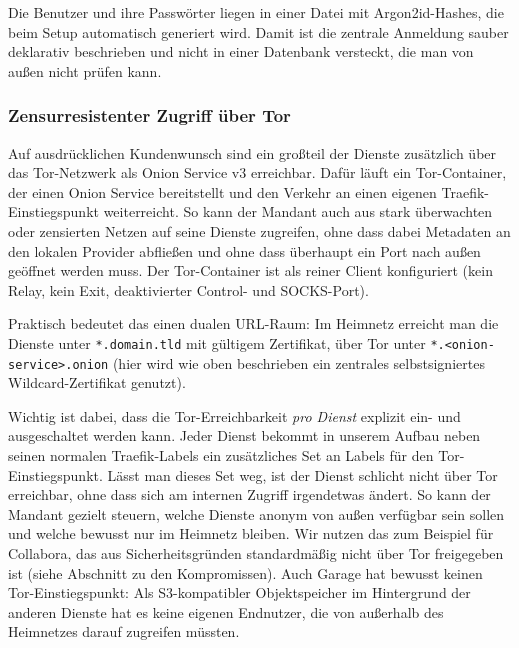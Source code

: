 Die Benutzer und ihre Passwörter liegen in einer Datei mit Argon2id-Hashes, die
beim Setup automatisch generiert wird. Damit ist die zentrale Anmeldung sauber
deklarativ beschrieben und nicht in einer Datenbank versteckt, die man von außen
nicht prüfen kann.

\subsubsection{Zensurresistenter Zugriff über Tor}

Auf ausdrücklichen Kundenwunsch sind ein großteil der Dienste zusätzlich über das
Tor-Netzwerk als Onion Service v3 erreichbar. Dafür läuft ein Tor-Container,
der einen Onion Service bereitstellt und den Verkehr an einen eigenen
Traefik-Einstiegspunkt weiterreicht. So kann der Mandant auch aus stark
überwachten oder zensierten Netzen auf seine Dienste zugreifen, ohne dass dabei
Metadaten an den lokalen Provider abfließen und ohne dass überhaupt ein Port
nach außen geöffnet werden muss. Der Tor-Container ist als reiner Client
konfiguriert (kein Relay, kein Exit, deaktivierter Control- und \ac{SOCKS}-Port).

Praktisch bedeutet das einen dualen \ac{URL}-Raum: Im Heimnetz erreicht man die
Dienste unter \texttt{*.domain.tld} mit gültigem Zertifikat, über Tor unter
\texttt{*.<onion-service>.onion} (hier wird wie oben beschrieben ein zentrales selbstsigniertes Wildcard-Zertifikat genutzt).

Wichtig ist dabei, dass die Tor-Erreichbarkeit \emph{pro Dienst} explizit
ein- und ausgeschaltet werden kann. Jeder Dienst bekommt in unserem Aufbau
neben seinen normalen Traefik-Labels ein zusätzliches Set an Labels für den
Tor-Einstiegspunkt. Lässt man dieses Set weg, ist der Dienst schlicht nicht
über Tor erreichbar, ohne dass sich am internen Zugriff irgendetwas ändert. So
kann der Mandant gezielt steuern, welche Dienste anonym von außen verfügbar sein
sollen und welche bewusst nur im Heimnetz bleiben. Wir nutzen das zum Beispiel
für Collabora, das aus Sicherheitsgründen standardmäßig nicht über Tor
freigegeben ist (siehe Abschnitt zu den Kompromissen). Auch Garage hat bewusst
keinen Tor-Einstiegspunkt: Als \acs{S3}-kompatibler Objektspeicher im Hintergrund
der anderen Dienste hat es keine eigenen Endnutzer, die von außerhalb des
Heimnetzes darauf zugreifen müssten.

